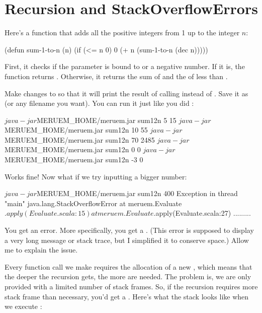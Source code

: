 \section{Recursion and StackOverflowErrors}

Here's a function that adds all the positive integers from 1 up to the integer $n$: 

\begin{Meruem}
(defun sum-1-to-n (n)
  (if (<= n 0)
    0    
    (+ n (sum-1-to-n (dec n)))))
\end{Meruem}

First, it checks if the parameter is bound to  or a negative number. If it is, the function returns . Otherwise, it returns the sum of  and the  of  less than . 

Make changes to  so that it will print the result of calling  instead of .  Save it as  (or any filename you want). You can run it just like you did :

\begin{REPL}
$ java -jar $MERUEM_HOME/meruem.jar sum12n 5
15
$ java -jar $MERUEM_HOME/meruem.jar sum12n 10
55
$ java -jar $MERUEM_HOME/meruem.jar sum12n 70
2485
$ java -jar $MERUEM_HOME/meruem.jar sum12n 0
0
$ java -jar $MERUEM_HOME/meruem.jar sum12n -3
0
\end{REPL}

Works fine! Now what if we try inputting a bigger number:

\begin{REPL}
$ java -jar $MERUEM_HOME/meruem.jar sum12n 400
Exception in thread "main" java.lang.StackOverflowError
	at meruem.Evaluate$.apply(Evaluate.scala:15)
	at meruem.Evaluate$.apply(Evaluate.scala:27)
.........
\end{REPL}

You get an error. More specifically, you get a . (This error is supposed to display a very long message or stack trace, but I simplified it to conserve space.) Allow me to explain the issue. 

Every function call we make requires the allocation of a new , which means that the deeper the recursion gets, the more  are needed. The problem is, we are only provided with a limited number of stack frames. So, if the recursion requires more stack frame than necessary, you'd get a . Here's what the stack looks like when we execute :

